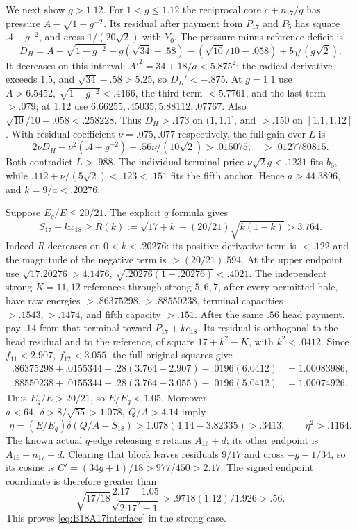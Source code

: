 \documentclass[11pt]{article}
\theoremstyle{definition}
\theoremstyle{remark}
\begin{document}
We next show \(g>1.12\). For \(1<g\leq1.12\) the reciprocal core
\(c+n_{17}/g\) has pressure \(A-\sqrt{1-g^{-2}}\).
Its residual after payment from \(P_{17}\) and \(P_5\) has square
\(.4+g^{-2}\), and cross \(1/(20\sqrt2)\) with \(Y_0\).
The pressure-minus-reference deficit is
\[
 D_H=A-\sqrt{1-g^{-2}}-g(\sqrt{34}-.58)
       -(\sqrt{10}/10-.058)+b_0/(g\sqrt2).
\]
It decreases on this interval: \(A'^2=34+18/a<5.875^2\);
the radical derivative exceeds \(1.5\), and
\(\sqrt{34}-.58>5.25\), so \(D_H'<-.875\).
At \(g=1.1\) use \(A>6.5452,\ \sqrt{1-g^{-2}}<.4166\),
the third term \(<5.7761\), and the last term \(>.079\);
at \(1.12\) use \(6.66255,.45035,5.88112,.07767\).
Also \(\sqrt{10}/10-.058<.258228\).
Thus \(D_H>.173\) on \((1,1.1]\), and \(>.150\) on
\([1.1,1.12]\).
With residual coefficient \(\nu=.075,.077\) respectively, the
full gain over \(L\) is
\[
 2\nu D_H-\nu^2(.4+g^{-2})-.56\nu/(10\sqrt2)
 >.015075,\quad >.0127780815 .
\]
Both contradict \(L>.988\). The individual terminal price
\(\nu\sqrt2g<.1231\) fits \(b_0\), while
\(.112+\nu/(5\sqrt2)<.123<.151\) fits the fifth anchor.
Hence \(a>44.3896\), and \(k=9/a<.20276\).

Suppose \(E_q/E\leq20/21\).
The explicit \(q\) formula gives
\[
 S_{17}+kx_{18}\geq
 R(k):=\sqrt{17+k}-(20/21)\sqrt{k(1-k)}>3.764 .
\]
Indeed \(R\) decreases on \(0<k<.20276\): its positive derivative
term is \(<.122\) and the magnitude of the negative term is
\(>(20/21).594\). At the upper endpoint use
\(\sqrt{17.20276}>4.1476,\ \sqrt{.20276(1-.20276)}<.4021\).
The independent strong \(K=11,12\) references through strong \(5,6,7\),
after every permitted hole, have raw energies
\(>.86375298,>.88550238\), terminal capacities \(>.1543,>.1474\),
and fifth capacity \(>.151\).
After the same \(.56\) head payment, pay \(.14\) from that terminal
toward \(P_{17}+ke_{18}\).
Its residual is orthogonal to the head residual and to the reference,
of square \(17+k^2-K\), with \(k^2<.0412\). Since
\(f_{11}<2.907,\ f_{12}<3.055\), the full original squares give
\[
\begin{split}
 .86375298+.0155344+.28(3.764-2.907)-.0196(6.0412)
 &=1.00083986,\\
 .88550238+.0155344+.28(3.764-3.055)-.0196(5.0412)
 &=1.00074926 .
\end{split}
\]
Thus \(E_q/E>20/21\), so \(E/E_q<1.05\).
Moreover \(a<64,\ \delta>8/\sqrt{55}>1.078,\ Q/A>4.14\) imply
\[
 \eta=(E/E_q)\delta(Q/A-S_{18})
 >1.078(4.14-3.82335)>.3413,\qquad \eta^2>.1164 .
\]
The known actual \(q\)-edge releasing \(c\) retains \(A_{16}+d\);
its other endpoint is \(A_{16}+n_{17}+d\). Clearing that block
leaves residuals \(9/17\) and cross \(-g-1/34\), so its cosine is
\(C'=(34g+1)/18>977/450>2.17\).
The signed endpoint coordinate is therefore greater than
\[
 \sqrt{17/18}\frac{2.17-1.05}{\sqrt{2.17^2-1}}
 >.9718(1.12)/1.926>.56 .
\]
This proves \eqref{eq:B18A17interface} in the strong case.
\end{document}
